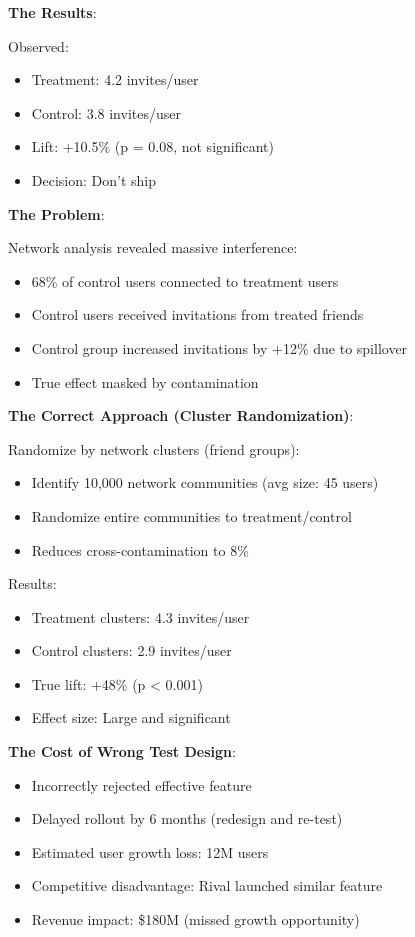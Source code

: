 \textbf{The Results}:

Observed:
\begin{itemize}
    \item Treatment: 4.2 invites/user
    \item Control: 3.8 invites/user
    \item Lift: +10.5\% (p = 0.08, not significant)
    \item Decision: Don't ship
\end{itemize}

\textbf{The Problem}:

Network analysis revealed massive interference:
\begin{itemize}
    \item 68\% of control users connected to treatment users
    \item Control users received invitations from treated friends
    \item Control group increased invitations by +12\% due to spillover
    \item True effect masked by contamination
\end{itemize}

\textbf{The Correct Approach (Cluster Randomization)}:

Randomize by network clusters (friend groups):
\begin{itemize}
    \item Identify 10,000 network communities (avg size: 45 users)
    \item Randomize entire communities to treatment/control
    \item Reduces cross-contamination to 8\%
\end{itemize}

Results:
\begin{itemize}
    \item Treatment clusters: 4.3 invites/user
    \item Control clusters: 2.9 invites/user
    \item True lift: +48\% (p < 0.001)
    \item Effect size: Large and significant
\end{itemize}

\textbf{The Cost of Wrong Test Design}:

\begin{itemize}
    \item Incorrectly rejected effective feature
    \item Delayed rollout by 6 months (redesign and re-test)
    \item Estimated user growth loss: 12M users
    \item Competitive disadvantage: Rival launched similar feature
    \item Revenue impact: \$180M (missed growth opportunity)
\end{itemize}

